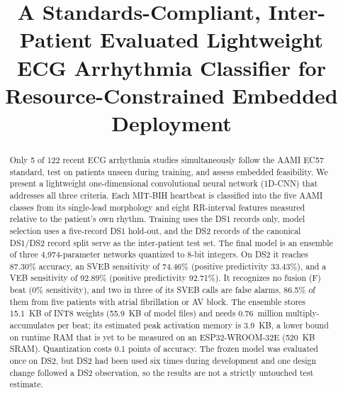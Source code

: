 \documentclass[conference]{IEEEtran}
\begin{document}
\title{A Standards-Compliant, Inter-Patient Evaluated Lightweight ECG Arrhythmia Classifier for Resource-Constrained Embedded Deployment}

\author{
\and
{}
\and
{}
}

\maketitle

\begin{abstract}
Only 5 of 122 recent ECG arrhythmia studies simultaneously follow the AAMI EC57 standard, test on patients unseen during training, and assess embedded feasibility. We present a lightweight one-dimensional convolutional neural network (1D-CNN) that addresses all three criteria. Each MIT-BIH heartbeat is classified into the five AAMI classes from its single-lead morphology and eight RR-interval features measured relative to the patient's own rhythm. Training uses the DS1 records only, model selection uses a five-record DS1 hold-out, and the DS2 records of the canonical DS1/DS2 record split serve as the inter-patient test set. The final model is an ensemble of three 4,974-parameter networks quantized to 8-bit integers. On DS2 it reaches 87.30\% accuracy, an SVEB sensitivity of 74.46\% (positive predictivity 33.43\%), and a VEB sensitivity of 92.89\% (positive predictivity 92.71\%). It recognizes no fusion (F) beat (0\% sensitivity), and two in three of its SVEB calls are false alarms, 86.5\% of them from five patients with atrial fibrillation or AV block. The ensemble stores 15.1~KB of INT8 weights (55.9~KB of model files) and needs 0.76~million multiply-accumulates per beat; its estimated peak activation memory is 3.9~KB, a lower bound on runtime RAM that is yet to be measured on an ESP32-WROOM-32E (520~KB SRAM). Quantization costs 0.1 points of accuracy. The frozen model was evaluated once on DS2, but DS2 had been used six times during development and one design change followed a DS2 observation, so the results are not a strictly untouched test estimate.
\end{abstract}
\end{document}
